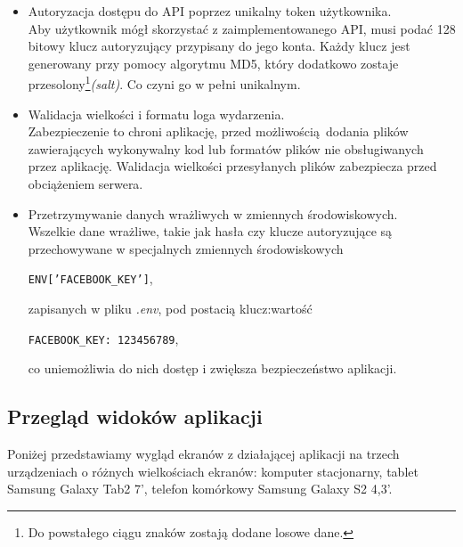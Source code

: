     \begin{itemize}
      \item Autoryzacja dostępu do API poprzez unikalny token użytkownika.\\
      Aby użytkownik mógł skorzystać z zaimplementowanego API, musi podać 128 bitowy klucz autoryzujący przypisany do jego konta. Każdy klucz jest generowany przy pomocy algorytmu MD5, który dodatkowo zostaje przesolony\footnote{Do powstałego ciągu znaków zostają dodane losowe dane.}\emph{(salt)}. Co czyni go w pełni unikalnym.

      \item Walidacja wielkości i formatu loga wydarzenia.\\
      Zabezpieczenie to chroni aplikację, przed możliwością dodania plików zawierających wykonywalny kod lub formatów plików nie obsługiwanych przez aplikację. Walidacja wielkości przesyłanych plików zabezpiecza przed obciążeniem serwera.

      \item Przetrzymywanie danych wrażliwych w zmiennych środowiskowych.\\
      Wszelkie dane wrażliwe, takie jak hasła czy klucze autoryzujące są przechowywane w specjalnych zmiennych środowiskowych
      \begin{center}
        \texttt{ENV['FACEBOOK\_KEY']},
      \end{center}
      zapisanych w pliku \emph{.env}, pod postacią klucz:wartość
      \begin{center}
        \texttt{FACEBOOK\_KEY: 123456789},
      \end{center}
      co uniemożliwia do nich dostęp i zwiększa bezpieczeństwo aplikacji.
    \end{itemize}

    \clearpage
    \subsection{Przegląd widoków aplikacji}
    Poniżej przedstawiamy wygląd ekranów z działającej aplikacji na trzech urządzeniach o różnych wielkościach ekranów: komputer stacjonarny, tablet Samsung Galaxy Tab2 7', telefon komórkowy Samsung Galaxy S2 4,3'.

